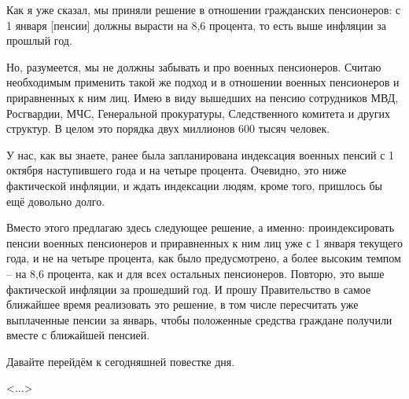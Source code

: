 Как я уже сказал, мы приняли решение в отношении гражданских пенсионеров: с 1
января [пенсии] должны вырасти на 8,6 процента, то есть выше инфляции за
прошлый год.

Но, разумеется, мы не должны забывать и про военных пенсионеров. Считаю
необходимым применить такой же подход и в отношении военных пенсионеров и
приравненных к ним лиц. Имею в виду вышедших на пенсию сотрудников МВД,
Росгвардии, МЧС, Генеральной прокуратуры, Следственного комитета и других
структур. В целом это порядка двух миллионов 600 тысяч человек.

У нас, как вы знаете, ранее была запланирована индексация военных пенсий с 1
октября наступившего года и на четыре процента. Очевидно, это ниже фактической
инфляции, и ждать индексации людям, кроме того, пришлось бы ещё довольно долго. 

Вместо этого предлагаю здесь следующее решение, а именно: проиндексировать
пенсии военных пенсионеров и приравненных к ним лиц уже с 1 января текущего
года, и не на четыре процента, как было предусмотрено, а более высоким темпом –
на 8,6 процента, как и для всех остальных пенсионеров. Повторю, это выше
фактической инфляции за прошедший год. И прошу Правительство в самое ближайшее
время реализовать это решение, в том числе пересчитать уже выплаченные пенсии
за январь, чтобы положенные средства граждане получили вместе с ближайшей
пенсией.

Давайте перейдём к сегодняшней повестке дня.

<...>

